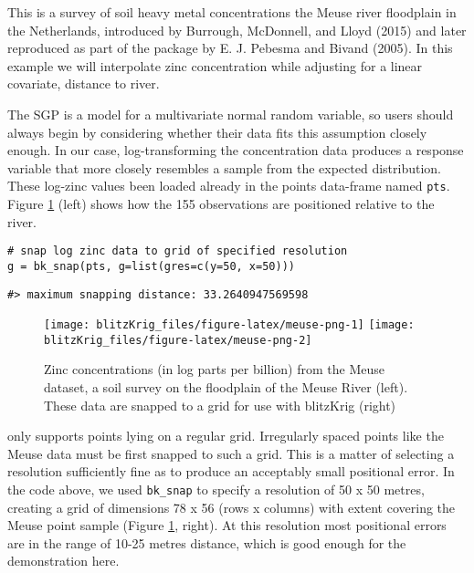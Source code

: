 This is a survey of soil heavy metal concentrations the Meuse river floodplain in the Netherlands, introduced by Burrough, McDonnell, and Lloyd (2015) and later reproduced as part of the  package by E. J. Pebesma and Bivand (2005). In this example we will interpolate zinc concentration while adjusting for a linear covariate, distance to river.

The SGP is a model for a multivariate normal random variable, so users should always begin by considering whether their data fits this assumption closely enough. In our case, log-transforming the concentration data produces a response variable that more closely resembles a sample from the expected distribution. These log-zinc values been loaded already in the  points data-frame named \texttt{pts}. Figure \ref{fig:meuse-png} (left) shows how the 155 observations are positioned relative to the river.

\begin{verbatim}
# snap log zinc data to grid of specified resolution
g = bk_snap(pts, g=list(gres=c(y=50, x=50)))
\end{verbatim}

\begin{verbatim}
#> maximum snapping distance: 33.2640947569598
\end{verbatim}

\begin{figure}
\texttt{[image: blitzKrig\_files/figure-latex/meuse-png-1]} \texttt{[image: blitzKrig\_files/figure-latex/meuse-png-2]} \caption{Zinc concentrations (in log parts per billion) from the Meuse dataset, a soil survey on the floodplain of the Meuse River (left). These data are snapped to a grid for use with blitzKrig (right)}\label{fig:meuse-png}
\end{figure}

 only supports points lying on a regular grid. Irregularly spaced points like the Meuse data must be first snapped to such a grid. This is a matter of selecting a resolution sufficiently fine as to produce an acceptably small positional error. In the code above, we used \texttt{bk\_snap} to specify a resolution of 50 x 50 metres, creating a grid of dimensions 78 x 56 (rows x columns) with extent covering the Meuse point sample (Figure \ref{fig:meuse-png}, right). At this resolution most positional errors are in the range of 10-25 metres distance, which is good enough for the demonstration here.

